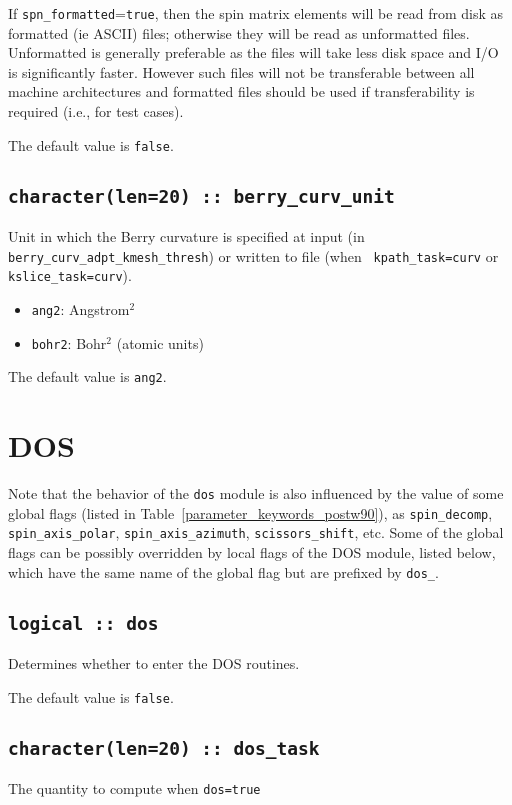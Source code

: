 If \verb#spn_formatted#=\verb#true#, then the spin matrix elements
will be read from disk as formatted (ie ASCII) files; otherwise they
will be read as unformatted files. Unformatted is generally preferable
as the files will take less disk space and I/O is significantly
faster. However such files will not be transferable between all
machine architectures and formatted files should be used if
transferability is required (i.e., for test cases).

The default value is \verb#false#.


\subsection[spn\_formatted]{\tt character(len=20) :: berry\_curv\_unit}

Unit in which the Berry curvature is specified at input (in {\tt
  berry\_curv\_adpt\_kmesh\_thresh}) or written to file (when {\tt
  kpath\_task=curv} or {\tt kslice\_task=curv}).

\begin{itemize}

\item
  {\tt ang2}: Angstrom$^2$

\item
  {\tt bohr2}: Bohr$^2$ (atomic units)

\end{itemize}

The default value is {\tt ang2}.

\clearpage
\section{DOS}
Note that the behavior of the \verb#dos# module  is also influenced by
the value of some global flags (listed in
Table~\ref{parameter_keywords_postw90}), as
\verb#spin_decomp#, \verb#spin_axis_polar#, \verb#spin_axis_azimuth#,
\verb#scissors_shift#, etc.
Some of the global flags can be possibly
overridden by local flags of the DOS module, listed below, which have
the same name of the global flag but are prefixed by \verb#dos_#.

\subsection[dos]{\tt logical :: dos}
Determines whether to enter the DOS routines.

The default value is \verb#false#.


\subsection[dos\_task]{\tt character(len=20) ::  dos\_task}
The quantity to compute when {\tt dos=true}

